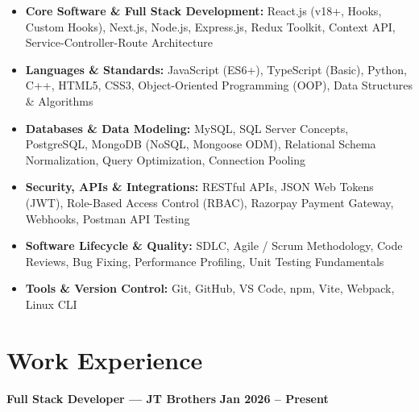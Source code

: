 \documentclass[a4paper,10pt]{article}
\begin{document}
\begin{itemize}

    \item \textbf{Core Software & Full Stack Development:}
    React.js (v18+, Hooks, Custom Hooks), Next.js, Node.js, Express.js,
    Redux Toolkit, Context API, Service-Controller-Route Architecture

    \item \textbf{Languages \& Standards:}
    JavaScript (ES6+), TypeScript (Basic), Python, C++, HTML5, CSS3,
    Object-Oriented Programming (OOP), Data Structures \& Algorithms

    \item \textbf{Databases \& Data Modeling:}
    MySQL, SQL Server Concepts, PostgreSQL, MongoDB (NoSQL, Mongoose ODM),
    Relational Schema Normalization, Query Optimization, Connection Pooling

    \item \textbf{Security, APIs \& Integrations:}
    RESTful APIs, JSON Web Tokens (JWT), Role-Based Access Control (RBAC),
    Razorpay Payment Gateway, Webhooks, Postman API Testing

    \item \textbf{Software Lifecycle \& Quality:}
    SDLC, Agile / Scrum Methodology, Code Reviews, Bug Fixing,
    Performance Profiling, Unit Testing Fundamentals

    \item \textbf{Tools \& Version Control:}
    Git, GitHub, VS Code, npm, Vite, Webpack, Linux CLI

\end{itemize}

\section*{Work Experience}

\textbf{Full Stack Developer --- JT Brothers}
\hfill
\textbf{Jan 2026 -- Present}
\end{document}
